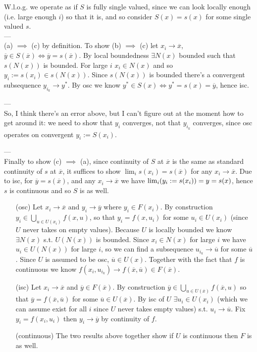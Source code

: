 \documentclass{article}
\newenvironment{ex}[1]
  {\renewcommand\theexercise{#1}\exercise}
  {\endexercise}
\begin{document}
\begin{ex}{2.13}
  W.l.o.g. we operate as if $S$ is fully single valued, since we can look locally enough (i.e. large enough $i$) so that it is, and so consider $S(x) = {s(x)}$ for some single valued $s$. \, \\
  --- \, \\
  \newcommand{\xb}{\overline{x}}
  \newcommand{\yb}{\overline{y}}
  (a) $\implies$ (c) by definition. To show (b) $\implies$ (c) let $x_i \to \xb$, $\yb \in S(\xb) \iff \yb = s(\xb)$. By local boundedness $\exists N(x)$ bounded such that $s(N(x))$ is bounded. For large $i$ $x_i \in N(x)$ and so $y_i := s(x_i) \in s(N(x))$. Since $s(N(x))$ is bounded there's a convergent subsequence $y_{i_k} \to y^*$. By osc we know $y^* \in S(x) \iff y^* = s(x) = \yb$, hence isc.

  --- \, \\
  So, I think there's an error above, but I can't figure out at the moment how to get around it: we need to show that $y_i$ converges, not that $y_{i_k}$ converges, since osc operates on convergent $y_i := S(x_i)$.

  --- \, \\
  Finally to show (c) $\implies$ (a), since continuity of $S$ at $\xb$ is the same as standard continuity of $s$ at $\xb$, it suffices to show $\lim_i s(x_i) = s(\xb)$ for any $x_i \to \xb$. Due to isc, for $\yb = s(\xb)$, and any $x_i \to \xb$ we have $\lim_i (y_i := s(x_i)) = y = s(x)$, hence $s$ is continuous and so $S$ is as well.
\end{ex}
\begin{ex}{2.15} \, \\
  \newcommand{\xb}{\overline{x}}
  \newcommand{\yb}{\overline{y}}
  \newcommand{\ub}{\overline{u}}
  \begin{itemize}
    \item[(osc)] Let $x_i \to \xb$ and $y_i \to \yb$ where $y_i \in F(x_i)$. By construction $y_i \in \bigcup_{u \in U(x_i)} f(x, u)$, so that $y_i = f(x, u_i)$ for some $u_i \in U(x_i)$ (since $U$ never takes on empty values). Because $U$ is locally bounded we know $\exists N(x)$ s.t. $U(N(x))$ is bounded. Since $x_i \in N(x)$ for large $i$ we have $u_i \in U(N(x))$ for large $i$, so we can find a subsequence $u_{i_k} \to \ub$ for some $\ub$. Since $U$ is assumed to be osc, $\ub \in U(x)$. Together with the fact that $f$ is continuous we know $f(x_i, u_{i_k}) \to f(\xb, \ub) \in F(\xb)$.
    \item[(isc)] Let $x_i \to \xb$ and $\yb \in F(\xb)$. By construction $\yb \in \bigcup_{u \in U(\xb)} f(\xb, u)$ so that $\yb = f(\xb, \ub)$ for some $\ub \in U(\xb)$. By isc of $U$ $\exists u_i \in U(x_i)$ (which we can assume exist for all $i$ since $U$ never takes empty values) s.t. $u_i \to \ub$. Fix $y_i = f(x_i, u_i)$ then $y_i \to \yb$ by continuity of $f$.
    \item[(continuous)] The two results above together show if $U$ is continuous then $F$ is as well.
  \end{itemize}
\end{ex}
\end{document}

